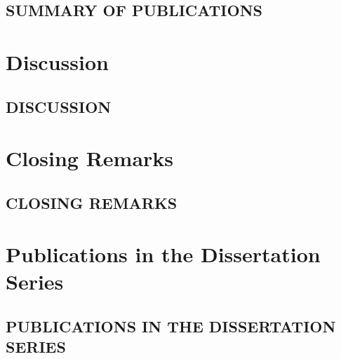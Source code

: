 \documentclass[english]{his-thesis}
\begin{document}
\chapter{SUMMARY OF PUBLICATIONS}
\label{ch:publications}





\part*{Discussion}
\label{part:discussion}

\chapter{DISCUSSION}
\label{ch:discussion}





\part*{Closing Remarks}
\label{part:closing-remarks}

\chapter{CLOSING REMARKS}
\label{ch:conclusions}





\setlength{}
\listofreferences




\begin{fullarticles}

\end{fullarticles}



\part*{Publications in the Dissertation Series}
\chapter*{PUBLICATIONS IN THE DISSERTATION SERIES}

\end{document}
